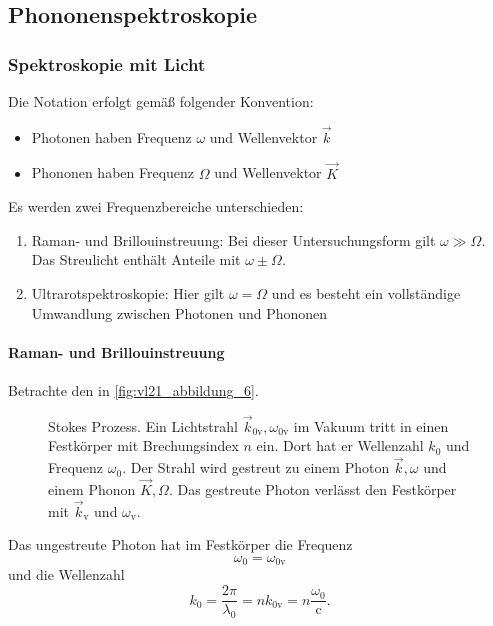 \subsection{Phononenspektroskopie}
\subsubsection{Spektroskopie mit Licht}
	Die Notation erfolgt gemäß folgender Konvention:
	\begin{itemize}
		\item Photonen haben Frequenz $\omega$ und Wellenvektor $\Vec{k}$ 
		\item Phononen haben Frequenz $\Omega$ und Wellenvektor $\Vec{K}$
	\end{itemize}

	Es werden zwei Frequenzbereiche unterschieden:
	\begin{enumerate}
		\item {Raman- und Brillouinstreuung:}
			Bei dieser Untersuchungsform gilt $\omega \gg \Omega$. Das Streulicht enthält Anteile mit $\omega \pm \Omega$.
		\item {Ultrarotspektroskopie:}
			Hier gilt $\omega = \Omega$ und es besteht ein vollständige Umwandlung zwischen Photonen und Phononen
	\end{enumerate}

\paragraph{Raman- und Brillouinstreuung}
	Betrachte den  in \autoref{fig:vl21_abbildung_6}.
	\begin{figure}[H]
		\centering
		\caption{Stokes Prozess. Ein Lichtstrahl $\vec k_{0\mathrm v}, \omega_{0\mathrm v}$ im Vakuum tritt in einen Festkörper mit Brechungsindex $n$ ein.
			Dort hat er Wellenzahl $k_0$ und Frequenz $\omega_0$.
			Der Strahl wird gestreut zu einem Photon $\vec k, \omega$ und einem Phonon $\vec K, \Omega$.
			Das gestreute Photon verlässt den Festkörper mit $\vec k_\mathrm v$ und $\omega_\mathrm v$.
		}
		\label{fig:vl21_abbildung_6}
	\end{figure}

	Das ungestreute Photon hat im Festkörper die Frequenz
	$$
	\omega_0 = \omega_{0\mathrm v}
	$$
	und die Wellenzahl
	$$
	k_{0} = \frac{2\pi}{\lambda_0} = n k_{0\mathrm v} = n \frac{\omega_0}{\mathrm{c}}.
	$$ 
